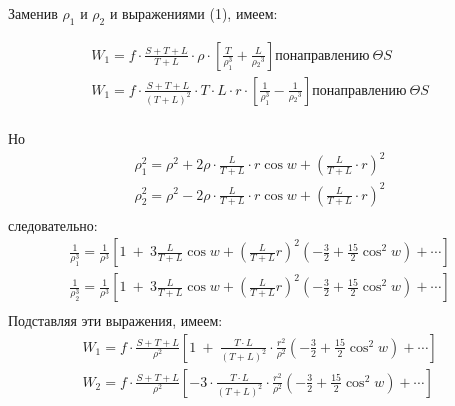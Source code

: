 \documentclass[a4paper,12pt]{article}
\begin{document}
Заменив $\rho_1$ и $\rho_2$ и выражениями (1), имеем:
\begin{center}
    \begin{equation*}
        \begin{aligned}
            W_1 = f\cdot\frac{S + T + L}{T + L}\cdot{\rho}\cdot\left[\frac{T}{\rho_{1}^3} + \frac{L}{\rho{_2}^3} \right] по направлению\: \Theta S \\
             W_1 = f\cdot\frac{S + T + L}{(T + L)^2}\cdot T \cdot L \cdot r \cdot\left[\frac{1}{\rho_{1}^3} - \frac{1}{\rho{_2}^3} \right] по направлению\: \Theta S \\
        \end{aligned}
    \end{equation*}
\end{center}
Но
\begin{equation*}
    \begin{aligned}
        \rho_1^2 = \rho^2 + 2\rho\cdot\frac{L}{T + L}\cdot r \cos w + \left(\frac{L}{T + L}\cdot r\right)^2 \\
        \rho_2^2 = \rho^2 - 2\rho\cdot\frac{L}{T + L}\cdot r \cos w + \left(\frac{L}{T + L}\cdot r\right)^2 \\
    \end{aligned}
\end{equation*}
следовательно:
\begin{equation*}
    \begin{aligned}
    \frac{1}{\rho_1^3} = \frac{1}{\rho^3}\left[1\:+\:3\frac{L}{T + L}\cos w +\left(\frac{L}{T + L}r\right)^2\left(-\frac{3}{2}+\frac{15}{2}\cos^2 w\right)+\cdots\right]\\
    \frac{1}{\rho_2^3} = \frac{1}{\rho^3}\left[1\:+\:3\frac{L}{T + L}\cos w +\left(\frac{L}{T + L}r\right)^2\left(-\frac{3}{2}+\frac{15}{2}\cos^2 w\right)+\cdots\right]\\
    \end{aligned}
\end{equation*}
Подставляя эти выражения, имеем:
\begin{equation*}
    \begin{aligned}
        W_1 = f\cdot\frac{S + T + L}{\rho^2}\left[1\:+\:\frac{T\cdot L}{(T + L)^2}\cdot\frac{r^2}{\rho^2}\left(-\frac{3}{2}+\frac{15}{2}\cos^2 w\right)+\cdots\right]\\
         W_2 = f\cdot\frac{S + T + L}{\rho^2}\left[-3\cdot\frac{T\cdot L}{(T + L)^2}\cdot\frac{r^2}{\rho^2}\left(-\frac{3}{2}+\frac{15}{2}\cos^2 w\right)+\cdots\right]\\
    \end{aligned}
\end{equation*}
\end{document}
